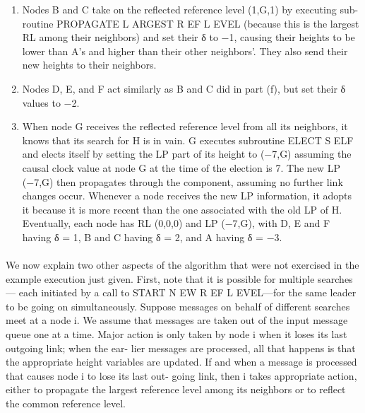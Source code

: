 \begin{enumerate}[label=\alph*]
	\item Nodes B and C take on the reflected reference level (1,G,1) by executing sub- routine PROPAGATE L ARGEST R EF L EVEL (because this is the largest RL among their neighbors) and set their δ to −1, causing their heights to be lower than A’s and higher than their other neighbors’. They also send their new heights to their neighbors.
	\item Nodes D, E, and F act similarly as B and C did in part (f), but set their δ values to −2.
	\item When node G receives the reflected reference level from all its neighbors, it knows that its search for H is in vain. G executes subroutine ELECT S ELF and elects itself by setting the LP part of its height to (−7,G) assuming the causal clock value at node G at the time of the election is 7. The new LP (−7,G) then propagates through the component, assuming no further link changes occur. Whenever a node receives the new LP information, it adopts it because it is more recent than the one associated with the old LP of H. Eventually, each node has RL (0,0,0) and LP (−7,G), with D, E and F having δ = 1, B and C having δ = 2, and A having δ = −3.
\end{enumerate}
\paragraph{}We now explain two other aspects of the algorithm that were not exercised in the example execution just given. First, note that it is possible for multiple searches— each initiated by a call to START N EW R EF L EVEL—for the same leader to be going on simultaneously. Suppose messages on behalf of different searches meet at a node i. We assume that messages are taken out of the input message queue one at a time. Major action is only taken by node i when it loses its last outgoing link; when the ear- lier messages are processed, all that happens is that the appropriate height variables are updated. If and when a message is processed that causes node i to lose its last out- going link, then i takes appropriate action, either to propagate the largest reference level among its neighbors or to reflect the common reference level.
